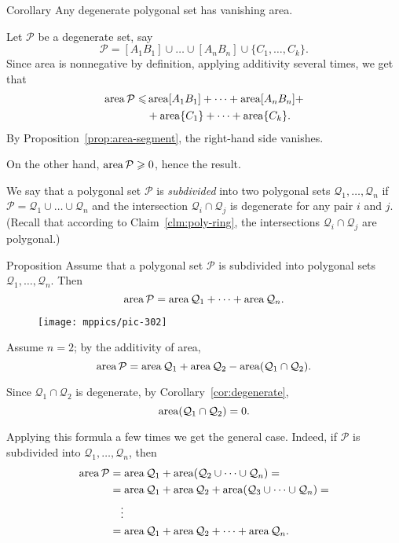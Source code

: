 {\begin{thm}{Corollary}\label{cor:degenerate}
Any degenerate polygonal set has vanishing area.
\end{thm}

Let $\mathcal P$ be a degenerate set,
say
\[\mathcal{P}=[A_1B_1]\cup\dots\cup[A_nB_n]\cup\{C_1,\dots,C_k\}.\]
Since area is nonnegative by definition, applying additivity several times, we get that
\begin{align*}
\mathop{\rm area}\nolimits\mathcal{P}\leqslant
& \mathop{\rm area}\nolimits[A_1B_1]+\dots+\mathop{\rm area}\nolimits[A_nB_n]+
\\
&+\mathop{\rm area}\nolimits\{C_1\}+\dots+\mathop{\rm area}\nolimits\{C_k\}.
\end{align*}
By Proposition~\ref{prop:area-segment}, the right-hand side vanishes.

On the other hand, 
$\mathop{\rm area}\nolimits\mathcal{P}\geqslant 0$,
hence the result.
\qeds

We say that a polygonal set $\mathcal{P}$ is \emph{subdivided} 
into two polygonal sets $\mathcal{Q}_1,\dots,\mathcal{Q}_n$ 
if $\mathcal{P}=\mathcal{Q}_1\cup\dots\cup \mathcal{Q}_n$ 
and the intersection $\mathcal{Q}_i\cap\mathcal{Q}_j$ is degenerate for any pair $i$ and $j$.
(Recall that according to Claim~\ref{clm:poly-ring},
the intersections $\mathcal{Q}_i\cap\mathcal{Q}_j$ are polygonal.)

\begin{thm}{Proposition}\label{prop:subdivision}
Assume that a polygonal set $\mathcal{P}$ is subdivided into polygonal sets $\mathcal{Q}_1,\dots,\mathcal{Q}_n$.
Then 
\[\mathop{\rm area}\nolimits\mathcal{P}=\mathop{\rm area}\nolimits\mathcal{Q}_1+\dots+\mathop{\rm area}\nolimits\mathcal{Q}_n.\]

\end{thm}

\begin{wrapfigure}{o}{26 mm}
\vskip-4mm
\centering
\texttt{[image: mppics/pic-302]}
\end{wrapfigure}

Assume $n=2$; by the additivity of area,
\[\mathop{\rm area}\nolimits\mathcal{P}=\mathop{\rm area}\nolimits\mathcal{Q}_1+\mathop{\rm area}\nolimits\mathcal{Q}_2-\mathop{\rm area}\nolimits(\mathcal{Q}_1\cap\mathcal{Q}_2).\]

Since $\mathcal{Q}_1\cap\mathcal{Q}_2$ is degenerate,
by Corollary~\ref{cor:degenerate},
\[\mathop{\rm area}\nolimits(\mathcal{Q}_1\cap\mathcal{Q}_2)=0.\]

Applying this formula a few times we get the general case.
Indeed, if $\mathcal{P}$ is subdivided into $\mathcal{Q}_1,\dots,\mathcal{Q}_n$, then
\begin{align*}
\mathop{\rm area}\nolimits\mathcal{P}&=\mathop{\rm area}\nolimits\mathcal{Q}_1+\mathop{\rm area}\nolimits(\mathcal{Q}_2\cup\dots\cup\mathcal{Q}_n)=
\\
&=\mathop{\rm area}\nolimits\mathcal{Q}_1+\mathop{\rm area}\nolimits \mathcal{Q}_2+\mathop{\rm area}\nolimits( \mathcal{Q}_3\cup\dots\cup\mathcal{Q}_n)=
\\
&\ \ \ \vdots
\\
&=\mathop{\rm area}\nolimits\mathcal{Q}_1+\mathop{\rm area}\nolimits \mathcal{Q}_2+\dots+\mathop{\rm area}\nolimits\mathcal{Q}_n.
\end{align*}
\qedsf

}
